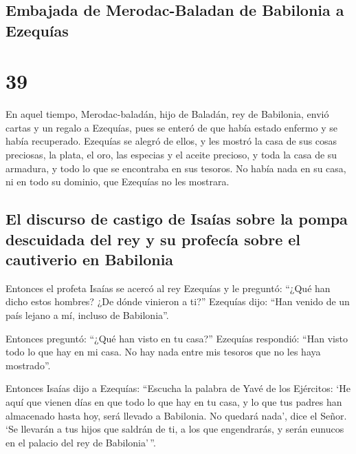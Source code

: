 \hypertarget{embajada-de-merodac-baladan-de-babilonia-a-ezequuxedas}{%
\subsection{Embajada de Merodac-Baladan de Babilonia a
Ezequías}\label{embajada-de-merodac-baladan-de-babilonia-a-ezequuxedas}}

\hypertarget{section-38}{%
\section{39}\label{section-38}}

 En aquel tiempo, Merodac-baladán, hijo de Baladán, rey de
Babilonia, envió cartas y un regalo a Ezequías, pues se enteró de que
había estado enfermo y se había recuperado.  Ezequías se
alegró de ellos, y les mostró la casa de sus cosas preciosas, la plata,
el oro, las especias y el aceite precioso, y toda la casa de su
armadura, y todo lo que se encontraba en sus tesoros. No había nada en
su casa, ni en todo su dominio, que Ezequías no les mostrara.

\hypertarget{el-discurso-de-castigo-de-isauxedas-sobre-la-pompa-descuidada-del-rey-y-su-profecuxeda-sobre-el-cautiverio-en-babilonia}{%
\subsection{El discurso de castigo de Isaías sobre la pompa descuidada
del rey y su profecía sobre el cautiverio en
Babilonia}\label{el-discurso-de-castigo-de-isauxedas-sobre-la-pompa-descuidada-del-rey-y-su-profecuxeda-sobre-el-cautiverio-en-babilonia}}

 Entonces el profeta Isaías se acercó al rey Ezequías y le
preguntó: ``¿Qué han dicho estos hombres? ¿De dónde vinieron a ti?''
Ezequías dijo: ``Han venido de un país lejano a mí, incluso de
Babilonia''.

 Entonces preguntó: ``¿Qué han visto en tu casa?''
Ezequías respondió: ``Han visto todo lo que hay en mi casa. No hay nada
entre mis tesoros que no les haya mostrado''.

 Entonces Isaías dijo a Ezequías: ``Escucha la palabra de
Yavé de los Ejércitos:  `He aquí que vienen días en que
todo lo que hay en tu casa, y lo que tus padres han almacenado hasta
hoy, será llevado a Babilonia. No quedará nada', dice el Señor.
 `Se llevarán a tus hijos que saldrán de ti, a los que
engendrarás, y serán eunucos en el palacio del rey de Babilonia'\,''.

